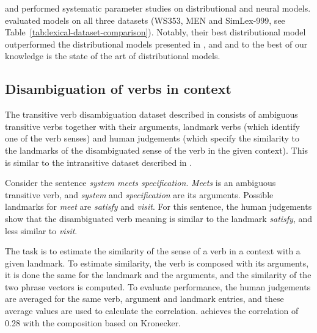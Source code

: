 
 and  performed systematic parameter studies on distributional and neural models.  evaluated models on all three datasets (WS353, MEN and SimLex-999, see Table~\ref{tab:lexical-dataset-comparison}). Notably, their best distributional model outperformed the distributional models presented in \citet{hill2014simlex}, \citet{kiela-clark:2014:CVSC} and \citet{baroni-dinu-kruszewski:2014:P14-1} and to the best of our knowledge is the state of the art of distributional models.

\subsection{Disambiguation of verbs in context}
\label{sec:disamb}

The transitive verb disambiguation dataset
described in \citet{Grefenstette:2011:ETV:2140490.2140497,Grefenstette:2011:ESC:2145432.2145580} consists of ambiguous transitive verbs together with their arguments, landmark verbs (which identify one of the verb senses) and human judgements (which specify the similarity to the landmarks of the disambiguated sense of the verb in the given context). This is similar to the intransitive dataset described in .

Consider the sentence \textit{system meets specification}. \textit{Meets} is an ambiguous transitive verb, and \textit{system}
and \textit{specification} are its arguments. Possible landmarks for \emph{meet} are \textit{satisfy} and \textit{visit}. For this sentence, the human judgements show that the disambiguated verb meaning is similar to the landmark \textit{satisfy}, and less similar to \textit{visit}.

The task is to estimate the similarity of the sense of a verb in a context with a given landmark. To estimate similarity, the verb is composed with its arguments, it is done the same for the landmark and the arguments, and the similarity of the two phrase vectors is computed. To evaluate performance, the human judgements are averaged for the same verb, argument and landmark entries, and these average values are used to calculate the correlation. \citet{Grefenstette:2011:ETV:2140490.2140497} achieves the correlation of 0.28 with the composition based on Kronecker.

